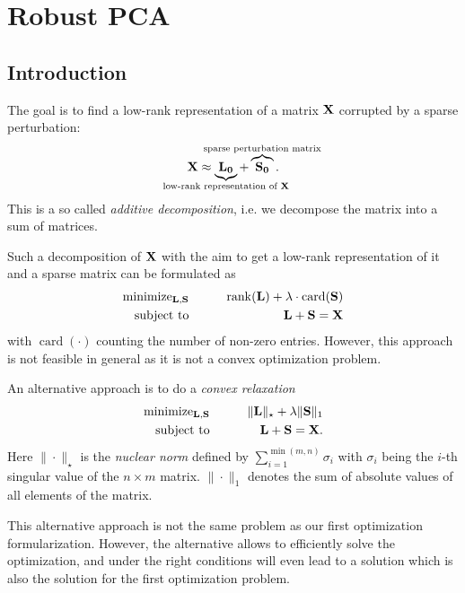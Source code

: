 \chapter{Robust PCA}
\section{Introduction}
The goal is to find a low-rank representation of a matrix \(\boldsymbol{\mathrm{X}}\) corrupted by a sparse perturbation:
\[
\matr{X} \approx \underbrace{\matr{L_0}}_{\mathclap{\text{low-rank representation of } \matr{X}}} + \overbrace{\matr{S_0}}^{\mathclap{\text{sparse perturbation matrix}}}.
\]
This is a so called \emph{additive decomposition}, i.e. we decompose the matrix into a sum of matrices.

Such a decomposition of \(\boldsymbol{\mathrm{X}}\) with the aim to get a low-rank representation of it and a sparse matrix can be formulated as
\begin{eqnarray*}
\text{minimize}_{\boldsymbol{\mathrm{L}}, \boldsymbol{\mathrm{S}}}& \quad\quad &\operatorname{rank}(\boldsymbol{\mathrm{L}}) + \lambda \cdot \operatorname{card}(\boldsymbol{\mathrm{S}})\\
\text{subject to}& &\boldsymbol{\mathrm{L}} + \boldsymbol{\mathrm{S}} = \boldsymbol{\mathrm{X}}
\end{eqnarray*}
with \(\operatorname{card}(\cdot)\) counting the number of non-zero entries. However, this approach is not feasible in general as it is not a convex optimization problem.

An alternative approach is to do a \emph{convex relaxation}
\begin{eqnarray*}
\text{minimize}_{\boldsymbol{\mathrm{L}}, \boldsymbol{\mathrm{S}}}& \quad\quad &\|\boldsymbol{\mathrm{L}}\|_\star + \lambda \|\boldsymbol{\mathrm{S}}\|_1\\
\text{subject to}& &\boldsymbol{\mathrm{L}} + \boldsymbol{\mathrm{S}} = \boldsymbol{\mathrm{X}}.
\end{eqnarray*}
Here \(\|\cdot\|_\star\) is the \emph{nuclear norm} defined by \(\sum_{i=1}^{\min(m,n)} \sigma_i\) with \(\sigma_i\) being the \(i\)-th singular value of the \(n \times m\) matrix. \(\| \cdot \|_1\) denotes the sum of absolute values of all elements of the matrix.

This alternative approach is not the same problem as our first optimization formularization. However, the alternative allows to efficiently solve the optimization, and under the right conditions will even lead to a solution which is also the solution for the first optimization problem. 


